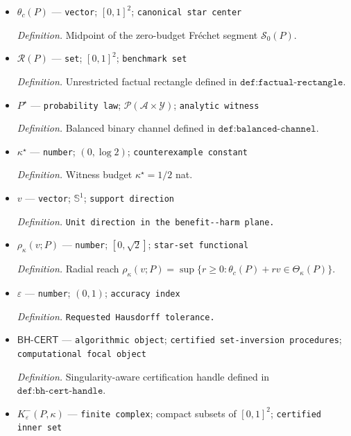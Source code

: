 \documentclass{article}
\begin{document}
\begin{itemize}
  \par\smallskip\noindent\emph{Definition.} Zero-budget Fréchet segment defined in \(\texttt{def:zero-budget-segment}\).
  \item \(\theta_c(P)\) --- \texttt{vector}; \([0,1]^2\); \texttt{canonical star center}
  \par\smallskip\noindent\emph{Definition.} Midpoint of the zero-budget Fréchet segment \(\mathcal S_0(P)\).
  \item \(\mathcal R(P)\) --- \texttt{set}; \([0,1]^2\); \texttt{benchmark set}
  \par\smallskip\noindent\emph{Definition.} Unrestricted factual rectangle defined in \(\texttt{def:factual-rectangle}\).
  \item \(P^\star\) --- \texttt{probability law}; \(\mathcal P(\mathcal A\times\mathcal Y)\); \texttt{analytic witness}
  \par\smallskip\noindent\emph{Definition.} Balanced binary channel defined in \(\texttt{def:balanced-channel}\).
  \item \(\kappa^\star\) --- \texttt{number}; \((0,\log 2)\); \texttt{counterexample constant}
  \par\smallskip\noindent\emph{Definition.} Witness budget \(\kappa^\star=1/2\) nat.
  \item \(v\) --- \texttt{vector}; \(\mathbb S^1\); \texttt{support direction}
  \par\smallskip\noindent\emph{Definition.} \texttt{Unit direction in the benefit-\allowbreak{}-\allowbreak{}harm plane.}
  \item \(\rho_\kappa(v;P)\) --- \texttt{number}; \([0,\sqrt2]\); \texttt{star-\allowbreak{}set functional}
  \par\smallskip\noindent\emph{Definition.} Radial reach \(\rho_\kappa(v;P)=\sup\{r\geq0:\theta_c(P)+rv\in\Theta_\kappa(P)\}\).
  \item \(\varepsilon\) --- \texttt{number}; \((0,1)\); \texttt{accuracy index}
  \par\smallskip\noindent\emph{Definition.} \texttt{Requested Hausdorff tolerance.}
  \item \(\mathsf{BH\mbox{-}CERT}\) --- \texttt{algorithmic object}; \texttt{certified set-\allowbreak{}inversion procedures}; \texttt{computational focal object}
  \par\smallskip\noindent\emph{Definition.} Singularity-aware certification handle defined in \(\texttt{def:bh-cert-handle}\).
  \item \(K^-_\varepsilon(P,\kappa)\) --- \texttt{finite complex}; compact subsets of \([0,1]^2\); \texttt{certified inner set}

\end{itemize}
\end{document}
